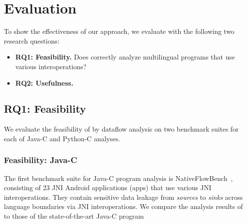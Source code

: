 \newcommand{\req}[1]{RQ#1}

\section{Evaluation}\label{sec:eval}



To show the effectiveness of our approach, we evaluate
\ours with the following two research questions:
\begin{itemize}
  \item \textbf{\req{1}: Feasibility.} Does \ours correctly analyze multilingual
    programs that use various interoperations?

  \item \textbf{\req{2}: Usefulness.} 
\end{itemize}

\subsection{\req{1}: Feasibility}
We evaluate the feasibility of \ours by dataflow analysis on
two benchmark suites for each of Java-C and Python-C analyses.

\subsubsection{Feasibility: Java-C}
The first benchmark suite for Java-C program analysis is NativeFlowBench~\cite{nativeflowbench, JN-SAF},
consisting of 23 JNI Android applications (apps) that use various JNI interoperations.
They contain sensitive data leakage from {\it sources} to {\it sinks}
across language boundaries via JNI interoperations.
We compare the analysis results of \ours to those of the state-of-the-art Java-C program

